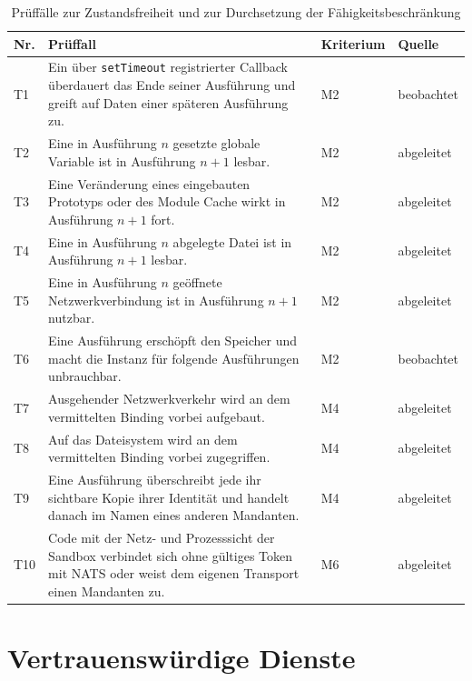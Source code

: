 \begin{table}[H]
  \caption{Prüffälle zur Zustandsfreiheit und zur Durchsetzung der Fähigkeitsbeschränkung}
  \label{tab:prueffaelle}
  \small
  \begin{tabularx}{\textwidth}{@{}l >{\RaggedRight\arraybackslash}X l l@{}}
    \hline
    Nr. & Prüffall & Kriterium & Quelle \\
    \hline
    T1 & Ein über \texttt{setTimeout} registrierter Callback überdauert das Ende seiner
         Ausführung und greift auf Daten einer späteren Ausführung zu. & M2 & beobachtet \\
    T2 & Eine in Ausführung $n$ gesetzte globale Variable ist in Ausführung $n+1$ lesbar. &
         M2 & abgeleitet \\
    T3 & Eine Veränderung eines eingebauten Prototyps oder des Module Cache wirkt in
         Ausführung $n+1$ fort. & M2 & abgeleitet \\
    T4 & Eine in Ausführung $n$ abgelegte Datei ist in Ausführung $n+1$ lesbar. & M2 &
         abgeleitet \\
    T5 & Eine in Ausführung $n$ geöffnete Netzwerkverbindung ist in Ausführung $n+1$ nutzbar.
         & M2 & abgeleitet \\
    T6 & Eine Ausführung erschöpft den Speicher und macht die Instanz für folgende
         Ausführungen unbrauchbar. & M2 & beobachtet \\
    T7 & Ausgehender Netzwerkverkehr wird an dem vermittelten Binding vorbei aufgebaut. &
         M4 & abgeleitet \\
        T8 & Auf das Dateisystem wird an dem vermittelten Binding vorbei zugegriffen. & M4 &
         abgeleitet \\
        T9 & Eine Ausführung überschreibt jede ihr sichtbare Kopie ihrer Identität und handelt
         danach im Namen eines anderen Mandanten. & M4 & abgeleitet \\
    T10 & Code mit der Netz- und Prozesssicht der Sandbox verbindet sich ohne gültiges Token mit NATS oder weist dem
         eigenen Transport einen Mandanten zu. & M6 & abgeleitet \\
    \hline
  \end{tabularx}
\end{table}

\section{Vertrauenswürdige Dienste}
\label{anh:tcb}

